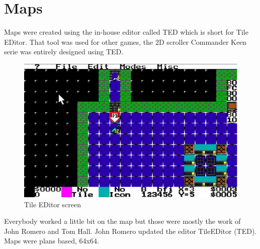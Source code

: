 \documentclass[book.tex]{subfiles}
\begin{document}
\section{Maps}
Maps were created using the in-house editor called TED which is short for Tile EDitor. That tool was used for other games, the 2D scroller Commander Keen serie was entirely designed using TED.\\
\begin{figure}[H]
\centering
 \includegraphics[scale=0.9]{imgs/TED.eps}
 \caption{Tile EDitor screen} \label{fig:mips}
 \end{figure}
 
Everybody worked a little bit on the map but those were mostly the work of John Romero and Tom Hall. John Romero updated the editor TileEDitor (TED). Maps were plans based, 64x64.\\
\end{document}
